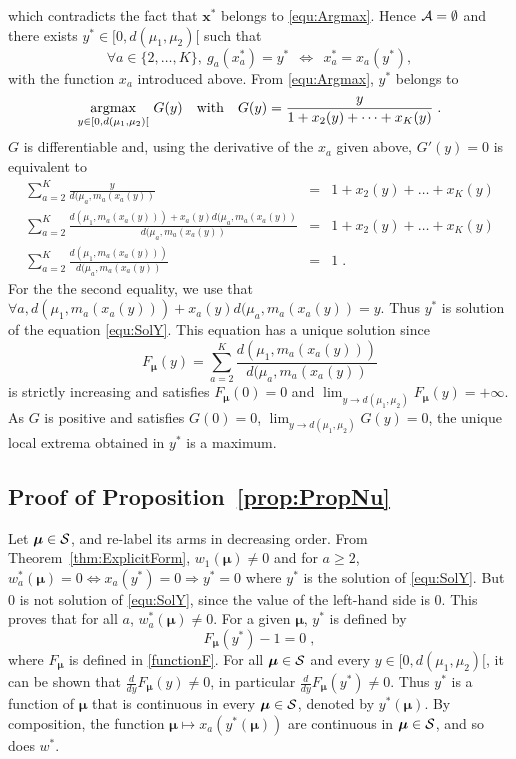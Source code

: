 \documentclass{colt2016} %
\begin{document}
which contradicts the fact that $\bm x^*$ belongs to \eqref{equ:Argmax}. Hence $\mathcal{A}=\emptyset$ and there exists $y^*\in [0,d(\mu_1,\mu_2)[$ such that 
\[\forall a \in \{2,\dots,K\}, \ g_a(x_a^*) = y^* \ \ \Leftrightarrow \ \ x_a^* = x_a(y^*),\]
with the function $x_a$ introduced above. From \eqref{equ:Argmax}, $y^*$ belongs to 
\begin{eqnarray*}
\argmax{y \in [0,d(\mu_1,\mu_2)[} \ G(y) \ \ \ \text{with} \ \ \ G(y)=\frac{y}{1 + x_2(y) + \dots + x_{K}(y)}\;. 
\end{eqnarray*}
$G$ is differentiable and, using the derivative of the $x_a$ given above, $G'(y)=0$ is equivalent to 
\begin{eqnarray}
 \sum_{a=2}^K\frac{y}{d(\mu_a,m_a(x_a(y))}&= &  1 + x_2(y) + \dots + x_{K}(y)\nonumber\\
\sum_{a=2}^K\frac{d(\mu_1,m_a(x_a(y))) + x_a(y)d(\mu_a,m_a(x_a(y))}{d(\mu_a,m_a(x_a(y))}  &= & 1 + x_2(y) + \dots + x_{K}(y)\nonumber\\
 \sum_{a=2}^K\frac{d(\mu_1,m_a(x_a(y)))}{d(\mu_a,m_a(x_a(y))} & = & 1\;.\label{equ:SolY}
\end{eqnarray}
For the the second equality, we use that $\forall a ,  d(\mu_1,m_a(x_a(y))) + x_a(y)d(\mu_a,m_a(x_a(y)) = y$. Thus $y^*$ is solution of the equation \eqref{equ:SolY}. This equation has a unique solution since 
\begin{equation}F_{\bm \mu}(y) = \sum_{a=2}^K \frac{d(\mu_1,m_a(x_a(y)))}{d(\mu_a,m_a(x_a(y))}\label{functionF}\end{equation}
is strictly increasing and satisfies $F_{\bm \mu}(0)=0$ and $\lim_{y \rightarrow d(\mu_1,\mu_2)} F_{\bm \mu}(y) = +\infty$. As $G$ is positive and satisfies $G(0)=0$, $\lim_{y \rightarrow d(\mu_1,\mu_2)} G(y)=0$, the unique local extrema obtained in $y^*$ is a maximum. 

\subsection{Proof of Proposition~\ref{prop:PropNu}}

Let $\bm \mu \in \mathcal{S}$, and re-label its arms in decreasing order. From Theorem~\ref{thm:ExplicitForm}, $w_{1}(\bm \mu) \neq 0$ and for $a\geq 2$, $w_a^*(\bm \mu) =0 \Leftrightarrow x_a(y^*)=0 \Rightarrow y^*=0$ where $y^*$ is the solution of \eqref{equ:SolY}. But $0$ is not solution of \eqref{equ:SolY}, since the value of the left-hand side is 0. This proves that for all $a$, $w_a^*(\bm \mu) \neq 0$. 
For a given $\bm\mu$, $y^*$ is defined by   
\[F_{\bm\mu}(y^*) - 1 =0\;,\]
where $F_{\bm\mu}$ is defined in \eqref{functionF}. For all $\bm \mu \in \mathcal{S}$ and every $y \in [0, d(\mu_1,\mu_2)[$, it can be shown that $\frac{d}{dy}F_{\bm\mu}(y) \neq 0$, in particular $\frac{d}{dy}F_{\bm\mu}(y^*)\neq 0$. Thus $y^*$ is a function of $\bm\mu$ that is continuous in every $\bm\mu \in \mathcal{S}$, denoted by $y^*(\bm\mu)$. By composition, the function $\bm \mu \mapsto x_a(y^*(\bm\mu))$ are continuous in $\bm \mu \in  \mathcal{S}$, and so does $w^*$.    
\end{document}
